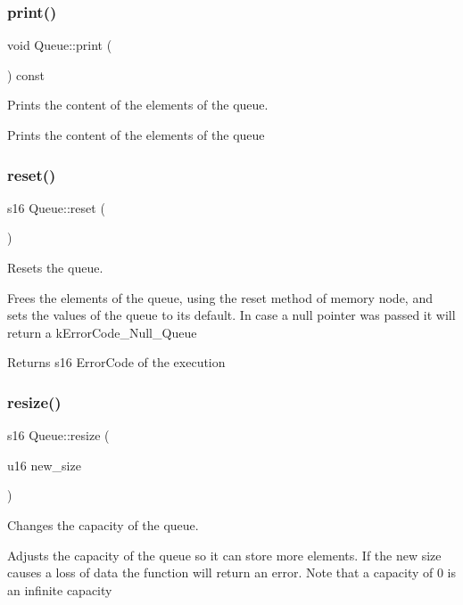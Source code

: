 \subsubsection{\texorpdfstring{print()}{print()}}
{\footnotesize\ttfamily void Queue\+::print (\begin{DoxyParamCaption}{ }\end{DoxyParamCaption}) const}



Prints the content of the elements of the queue. 

Prints the content of the elements of the queue \mbox{\label{class_queue_ad4f19940d14d343cf98a6fc3ba291079}} 
\subsubsection{\texorpdfstring{reset()}{reset()}}
{\footnotesize\ttfamily s16 Queue\+::reset (\begin{DoxyParamCaption}{ }\end{DoxyParamCaption})}



Resets the queue. 

Frees the elements of the queue, using the reset method of memory node, and sets the values of the queue to it\textquotesingle{}s default. In case a null pointer was passed it will return a k\+Error\+Code\+\_\+\+Null\+\_\+\+Queue

\begin{DoxyReturn}{Returns}
s16 Error\+Code of the execution 
\end{DoxyReturn}
\mbox{\label{class_queue_a47db3b18ecaae98ec954352ef911b171}} 
\subsubsection{\texorpdfstring{resize()}{resize()}}
{\footnotesize\ttfamily s16 Queue\+::resize (\begin{DoxyParamCaption}\item[{u16}]{new\+\_\+size }\end{DoxyParamCaption})}



Changes the capacity of the queue. 

Adjusts the capacity of the queue so it can store more elements. If the new size causes a loss of data the function will return an error. Note that a capacity of 0 is an infinite capacity

